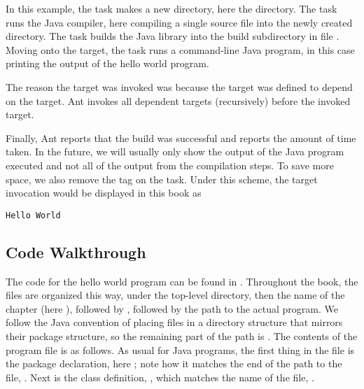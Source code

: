 In this example, the  task makes a new directory, here the 
 directory.  The  task runs the
Java compiler, here compiling a single source file into the
newly created directory.  The  task builds the Java
library into the build subdirectory  in file
.  Moving onto the  target,
the  task runs a command-line Java program, in this
case printing the output of the hello world program.

The reason the  target was invoked was because the
 target was defined to depend on the  target.
Ant invokes all dependent targets (recursively) before the invoked
target.

Finally, Ant reports that the build was successful and reports the
amount of time taken.  In the future, we will usually only show the
output of the Java program executed and not all of the output from the
compilation steps.  To save more space, we also remove the
\code{[java]} tag on the task.  Under this scheme, the 
target invocation would be displayed in this book as
%
\begin{verbatim}
Hello World
\end{verbatim}


\subsection{Code Walkthrough}\label{section-intro-hello-code}

The code for the hello world program can be found in
.
Throughout the book, the files are organized this way, under the
top-level  directory, then the name of the chapter (here
), followed by , followed by the path to
the actual program.  We follow the Java convention of placing files in
a directory structure that mirrors their package structure, so the
remaining part of the path is
.  The contents of
the  program file is as follows.
%
%
As usual for Java programs, the first thing in the file is the package
declaration, here ; note how it matches
the end of the path to the file, .
Next is the class definition, , which matches the
name of the file, .

